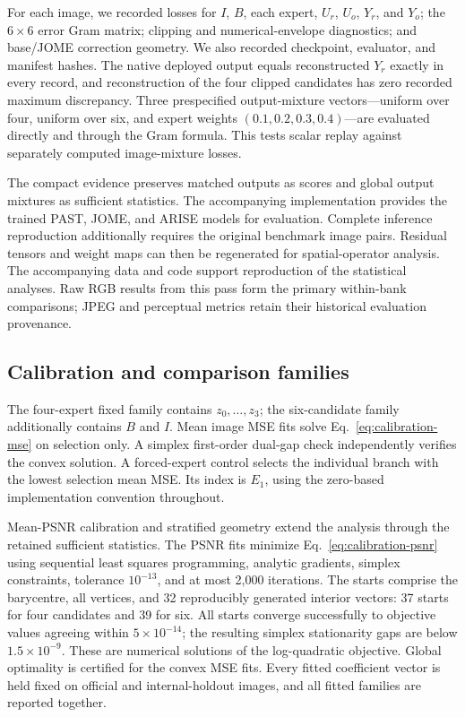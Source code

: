 \documentclass[12pt]{article}
\begin{document}
For each image, we recorded losses for $I$, $B$, each expert, $U_r$, $U_o$, $Y_r$, and $Y_o$; the $6\times6$ error Gram matrix; clipping and numerical-envelope diagnostics; and base/JOME correction geometry. We also recorded checkpoint, evaluator, and manifest hashes. The native deployed output equals reconstructed $Y_r$ exactly in every record, and reconstruction of the four clipped candidates has zero recorded maximum discrepancy. Three prespecified output-mixture vectors---uniform over four, uniform over six, and expert weights $(0.1,0.2,0.3,0.4)$---are evaluated directly and through the Gram formula. This tests scalar replay against separately computed image-mixture losses.

The compact evidence preserves matched outputs as scores and global output mixtures as sufficient statistics. The accompanying implementation provides the trained PAST, JOME, and ARISE models for evaluation. Complete inference reproduction additionally requires the original benchmark image pairs. Residual tensors and weight maps can then be regenerated for spatial-operator analysis. The accompanying data and code support reproduction of the statistical analyses. Raw RGB results from this pass form the primary within-bank comparisons; JPEG and perceptual metrics retain their historical evaluation provenance.

\subsection{Calibration and comparison families}
The four-expert fixed family contains $z_0,\ldots,z_3$; the six-candidate family additionally contains $B$ and $I$. Mean image MSE fits solve Eq.~\eqref{eq:calibration-mse} on selection only. A simplex first-order dual-gap check independently verifies the convex solution. A forced-expert control selects the individual branch with the lowest selection mean MSE. Its index is $E_1$, using the zero-based implementation convention throughout.

Mean-PSNR calibration and stratified geometry extend the analysis through the retained sufficient statistics. The PSNR fits minimize Eq.~\eqref{eq:calibration-psnr} using sequential least squares programming, analytic gradients, simplex constraints, tolerance $10^{-13}$, and at most 2,000 iterations. The starts comprise the barycentre, all vertices, and 32 reproducibly generated interior vectors: 37 starts for four candidates and 39 for six. All starts converge successfully to objective values agreeing within $5\times10^{-14}$; the resulting simplex stationarity gaps are below $1.5\times10^{-9}$. These are numerical solutions of the log-quadratic objective. Global optimality is certified for the convex MSE fits. Every fitted coefficient vector is held fixed on official and internal-holdout images, and all fitted families are reported together.
\end{document}
